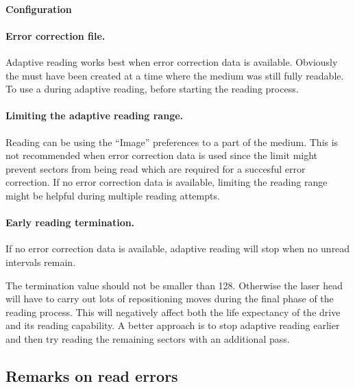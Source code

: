 \paragraph{Configuration}\quad

\medskip

\paragraph{Error correction file.} Adaptive reading works best when error
correction data is available. Obviously the  must have
been created at a time where the medium was
still fully readable. To use a  during 
adaptive reading,
 before starting the reading process.

\paragraph{Limiting the adaptive reading range.} Reading can
be  using the ``Image'' preferences
to a part of the medium. This is not recommended
when error correction data is used since the limit might prevent sectors
from being read which are required for a succesful error correction. If
no error correction data is available, limiting the reading range might
be helpful during multiple reading attempts.

\paragraph{Early reading termination.} If no error correction
data is available, adaptive reading will stop when no unread intervals
 remain.

The termination value should not be smaller than 128. Otherwise the laser
head will have to carry out lots of repositioning moves during the final
phase of the reading process. This will negatively affect both the life
expectancy of the drive and its reading capability. A better approach is
to stop adaptive reading earlier and then try reading the remaining sectors
with an additional  pass. 

\subsection{Remarks on read errors}
\label{background-read-errors}

